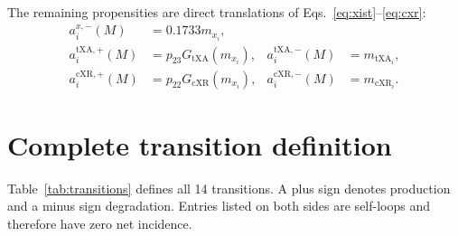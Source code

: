 \documentclass[11pt,a4paper]{article}
\newcommand{\txa}{\mathrm{tXA}}
\newcommand{\cxr}{\mathrm{cXR}}
\begin{document}
The remaining propensities are direct translations of
Eqs.~\eqref{eq:xist}--\eqref{eq:cxr}:
\begin{align*}
 a_i^{x,-}(M)&=0.1733m_{x_i},\\
 a_i^{\txa,+}(M)&=p_{23}G_{\txa}(m_{x_i}),&
 a_i^{\txa,-}(M)&=m_{\txa_i},\\
 a_i^{\cxr,+}(M)&=p_{22}G_{\cxr}(m_{x_i}),&
 a_i^{\cxr,-}(M)&=m_{\cxr_i}.
\end{align*}

\section{Complete transition definition}

Table~\ref{tab:transitions} defines all 14 transitions.  A plus sign denotes
production and a minus sign degradation.  Entries listed on both sides are
self-loops and therefore have zero net incidence.
\end{document}
